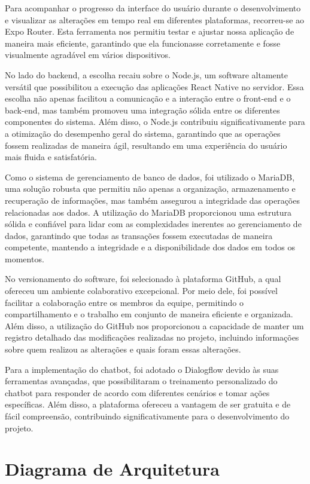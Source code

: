 \documentclass[
    article,			%
    12pt,				%
    oneside,            %
    a4paper,			%
    english,			%
    brazil,				%
    ]{abntex2}
\begin{document}
    Para acompanhar o progresso da interface do usuário durante o desenvolvimento e visualizar as alterações em tempo real em diferentes plataformas, recorreu-se ao Expo Router. Esta ferramenta nos permitiu testar e ajustar nossa aplicação de maneira mais eficiente, garantindo que ela funcionasse corretamente e fosse visualmente agradável em vários dispositivos.
    
    No lado do backend, a escolha recaiu sobre o Node.js, um software altamente versátil que possibilitou a execução das aplicações React Native no servidor. Essa escolha não apenas facilitou a comunicação e a interação entre o front-end e o back-end, mas também promoveu uma integração sólida entre os diferentes componentes do sistema. Além disso, o Node.js contribuiu significativamente para a otimização do desempenho geral do sistema, garantindo que as operações fossem realizadas de maneira ágil, resultando em uma experiência do usuário mais fluida e satisfatória.

    Como o sistema de gerenciamento de banco de dados, foi utilizado o MariaDB, uma solução robusta que permitiu não apenas a organização, armazenamento e recuperação de informações, mas também assegurou a integridade das operações relacionadas aos dados. A utilização do MariaDB proporcionou uma estrutura sólida e confiável para lidar com as complexidades inerentes ao gerenciamento de dados, garantindo que todas as transações fossem executadas de maneira competente, mantendo a integridade e a disponibilidade dos dados em todos os momentos.

    No versionamento do software, foi selecionado à plataforma GitHub, a qual ofereceu um ambiente colaborativo excepcional. Por meio dele, foi possível facilitar a colaboração entre os membros da equipe, permitindo o compartilhamento e o trabalho em conjunto de maneira eficiente e organizada. Além disso, a utilização do GitHub nos proporcionou a capacidade de manter um registro detalhado das modificações realizadas no projeto, incluindo informações sobre quem realizou as alterações e quais foram essas alterações. 

    Para a implementação do chatbot, foi adotado o Dialogflow devido às suas ferramentas avançadas, que possibilitaram o treinamento personalizado do chatbot para responder de acordo com diferentes cenários e tomar ações específicas. Além disso, a plataforma ofereceu a vantagem de ser gratuita e de fácil compreensão, contribuindo significativamente para o desenvolvimento do projeto.

\section{Diagrama de Arquitetura}
\end{document}
